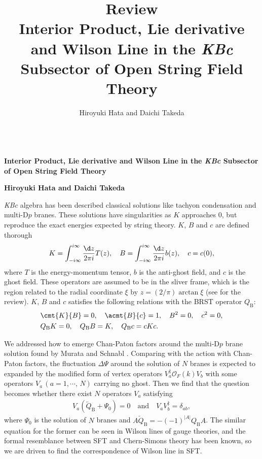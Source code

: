 \documentclass[12pt]{article}
\title{\textbf{Review}\\
Interior Product, Lie derivative and Wilson Line in the \textit{KBc} Subsector of Open String Field Theory
}
\author{Hiroyuki Hata and Daichi Takeda}
\date{}
\begin{document}
{\Large{}\\[2mm]
\textbf{Interior Product, Lie derivative and Wilson Line in the \textit{KBc} Subsector of Open String Field Theory
}
}

\noindent
\hfill\textbf{Hiroyuki Hata and Daichi Takeda}

\vspace{12pt}
\textit{KBc} algebra has been described classical solutions like tachyon condensation and multi-$\mathrm{D}p$ branes.
These solutions have singularities as $K$ approaches $0$, but reproduce the exact energies expected by string theory.
$K$, $B$ and $c$ are defined thorough
\begin{align}
	K = \int_{-i\infty}^{i\infty}\frac{\d z}{2\pi i}T(z),\quad
	B =  \int_{-i\infty}^{i\infty}\frac{\d z}{2\pi i}b(z),\quad 
	c = c(0),
\end{align}
where $T$ is the energy-momentum tensor, $b$ is the anti-ghost field, and $c$ is the ghost field.
These operators are assumed to be in the sliver frame, which is the region related to the radial coordinate $\xi$ by $z = (2/\pi)\arctan \xi$ (see \cite{Okawa:2012ica} for the review).
$K$, $B$ and $c$ satisfies the following relations with the BRST operator $Q_\mathrm{B}$:
\begin{align}
	&\cmt{K}{B} = 0,\quad
	\acmt{B}{c} = 1,\quad
	B^2 = 0,\quad
	c^2 = 0,\\
	&Q_\mathrm{B}K = 0,\quad
	Q_\mathrm{B}B = K,\quad
	Q_\mathrm{B}c = cKc.
\end{align}

We addressed how to emerge Chan-Paton factors around the multi-$\mathrm{D}p$ brane solution found by Murata and Schnabl \cite{Murata:2011ex}.
Comparing with the action with Chan-Paton factors, the fluctuation $\Delta\Psi$ around the solution of $N$ branes is expected to expanded by the modified form of vertex operators $V_a^\ddag\mathcal O_F(k) V_b$  with some operators $V_a\,(a = 1,\cdots,\,N)$ carrying no ghost.
Then we find that the question becomes whether there exist $N$ operators $V_a$ satisfying
\begin{align}
	V_a(\overleftarrow Q_\mathrm{B}+\Psi_0) = 0\quad
	\mathrm{and}\quad 
	V_aV_b^\ddag = \delta_{ab},\label{eq:Va_coditions}
\end{align}
where $\Psi_0$ is the solution of $N$ branes and $A\overleftarrow Q_\mathrm{B} = -(-1)^{|A|}Q_\mathrm{B}A$.
The similar equation for the former can be seen in Wilson lines of gauge theories, and the formal resemblance between SFT and Chern-Simons theory has been known,
so we are driven to find the correspondence of Wilson line in SFT.
\end{document}
